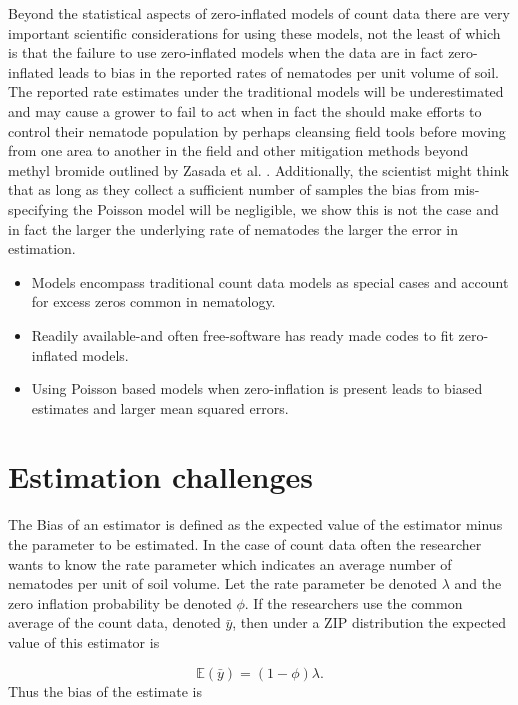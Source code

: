 \documentclass{article}
\begin{document}
Beyond the statistical aspects of zero-inflated models of count data there are very important scientific considerations for using these models, not the least of which is that the failure to use zero-inflated models when the data are in fact zero-inflated leads to bias in the reported rates of nematodes per unit volume of soil. The reported rate estimates under the traditional models will be underestimated and may cause a grower to fail to act when in fact the should make efforts to control their nematode population by perhaps cleansing field tools before moving from one area to another in the field and other mitigation methods beyond methyl bromide outlined by Zasada et al. \cite{zasada2010managing}.  Additionally, the scientist might think that as long as they collect a sufficient number of samples the bias from mis-specifying the Poisson model will be negligible, we show this is not the case and in fact the larger the underlying rate of nematodes the larger the error in estimation. 

\begin{itemize}
\item Models encompass traditional count data models as special cases and account for excess zeros common in nematology. 
\item Readily available-and often free-software has ready made codes to fit zero-inflated models. 
\item Using Poisson based models when zero-inflation is present leads to biased estimates and larger mean squared errors.   
\end{itemize}

\section{Estimation challenges}

The Bias of an estimator is defined as the expected value of the estimator minus the parameter to be estimated. In the case of count data often the researcher wants to know the rate parameter which indicates an average number of nematodes per unit of soil volume. Let the rate parameter be denoted $\lambda$ and the zero inflation probability be denoted $\phi$. If the researchers use the common average of the count data, denoted $\bar{y}$, then under a ZIP distribution the expected value of this estimator is 

\begin{equation}
\mathbb{E}(\bar{y}) = (1-\phi)\lambda.
\end{equation}
Thus the bias of the estimate is 
\end{document}
